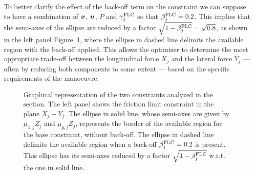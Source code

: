 To better clarify the effect of the back-off term on the constraint we can suppose to have a combination of $\boldsymbol{x}$, $\boldsymbol{u}$, $P$ and $\gamma^\textrm{FLC}_j$ so that $\beta^\textrm{FLC}_j=0.2$. This implies that the semi-axes of the ellipse are reduced by a factor $\sqrt{1-\beta^\textrm{FLC}_j} = \sqrt{0.8}$, as shown in the left panel Figure~\ref{fig:robust_constraints}, where the ellipse in dashed line delimits the available region with the back-off applied. This allows the optimizer to determine the most appropriate trade-off between the longitudinal force $X_j$ and the lateral force $Y_j$ --- often by reducing both components to some extent --- based on the specific requirements of the manoeuvre.


\begin{figure}
	\centering
	
	\hfill
	
	\caption{Graphical representation of the two constraints analyzed in the section. The left panel shows the friction limit constraint in the plane $X_j-Y_j$. The ellipse in solid line, whose semi-axes are given by $\mu_{x,j}Z_j$ and $\mu_{y,j}Z_j$, represents the border of the available region for the base constraint, without back-off. The ellipse in dashed line delimits the available region when a back-off $\beta^\textrm{FLC}_j=0.2$ is present. This ellipse has its semi-axes reduced by a factor $\sqrt{1-\beta^\textrm{FLC}_j}$ w.r.t. the one in solid line.
	}
	\label{fig:robust_constraints}
\end{figure}

